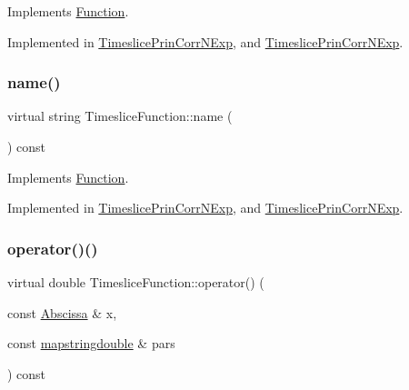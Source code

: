 Implements \mbox{\hyperlink{classFunction_ac6dc83996d6f002141a0a0f66f2c6496}{Function}}.



Implemented in \mbox{\hyperlink{classTimeslicePrinCorrNExp_a02d5af4384f14f17322e865c882c5b15}{Timeslice\+Prin\+Corr\+N\+Exp}}, and \mbox{\hyperlink{classTimeslicePrinCorrNExp_a02d5af4384f14f17322e865c882c5b15}{Timeslice\+Prin\+Corr\+N\+Exp}}.

\mbox{\label{classTimesliceFunction_addfcdb96287c354039a1536879cfe787}} 
\subsubsection{\texorpdfstring{name()}{name()}\hspace{0.1cm}{\footnotesize\ttfamily [2/2]}}
{\footnotesize\ttfamily virtual string Timeslice\+Function\+::name (\begin{DoxyParamCaption}{ }\end{DoxyParamCaption}) const\hspace{0.3cm}{\ttfamily [pure virtual]}}



Implements \mbox{\hyperlink{classFunction_ac6dc83996d6f002141a0a0f66f2c6496}{Function}}.



Implemented in \mbox{\hyperlink{classTimeslicePrinCorrNExp_a02d5af4384f14f17322e865c882c5b15}{Timeslice\+Prin\+Corr\+N\+Exp}}, and \mbox{\hyperlink{classTimeslicePrinCorrNExp_a02d5af4384f14f17322e865c882c5b15}{Timeslice\+Prin\+Corr\+N\+Exp}}.

\mbox{\label{classTimesliceFunction_ac4426035b36872933c70b5e0ad8cb4e3}} 
\subsubsection{\texorpdfstring{operator()()}{operator()()}\hspace{0.1cm}{\footnotesize\ttfamily [1/4]}}
{\footnotesize\ttfamily virtual double Timeslice\+Function\+::operator() (\begin{DoxyParamCaption}\item[{const \mbox{\hyperlink{classAbscissa}{Abscissa}} \&}]{x,  }\item[{const \mbox{\hyperlink{lib_2fitting__lib_2includes_8h_a647b481c557c7966517f753340a81d13}{mapstringdouble}} \&}]{pars }\end{DoxyParamCaption}) const\hspace{0.3cm}{\ttfamily [pure virtual]}}



